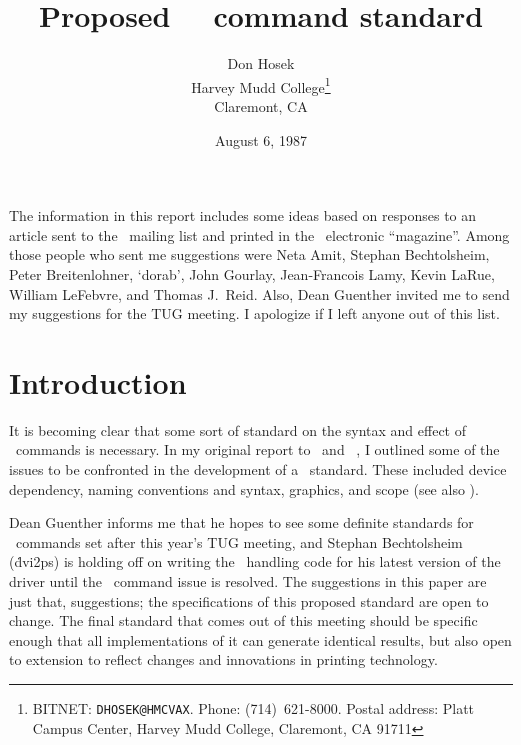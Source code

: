 

\title{Proposed \DVI\ \Special\ command standard}
\author{Don Hosek\\
         Harvey Mudd College\thanks{BITNET: {\tt DHOSEK@HMCVAX}.
         Phone: (714)~621-8000.
         Postal address: Platt Campus Center, Harvey Mudd College,
         Claremont, CA 91711}\\
         Claremont, CA}
\date{August 6, 1987}


\maketitle

The information in this report includes some ideas based on responses to
an article sent to the \TeXhax\ mailing list and printed in the \TeXMaG\
electronic ``magazine''. Among those people who sent me suggestions were
Neta Amit, Stephan Bechtolsheim, Peter Breitenlohner, `dorab', John
Gourlay, Jean-Francois Lamy, Kevin LaRue, William LeFebvre, and Thomas
J.~Reid. Also, Dean Guenther invited me to send my suggestions for the
TUG meeting. I apologize if I left anyone out of this list.

\section{Introduction}
It is becoming clear that some sort of standard on the syntax and
effect of \Special\ commands is necessary. In my original report to
\TeXhax\ and \TeXMaG\ \cite{hosek:specials}, I outlined some of the
issues to be confronted in the development of a \Special\ standard.
These included device dependency, naming conventions and syntax,
graphics, and scope (see also \cite{fox:changebars}).

Dean Guenther informs me that he hopes to see some definite standards
for \Special\ commands set after this year's TUG meeting, and
Stephan Bechtolsheim (\.{dvi2ps}) is holding off on writing the
\Special\ handling code for his latest version of the driver until the
\Special\ command issue is resolved. The suggestions in this paper are
just that, suggestions; the specifications of this proposed standard are
open to change. The final standard that comes out of this meeting should
be specific enough that all implementations of it can generate identical
results, but also open to extension to reflect changes and innovations
in printing technology.

